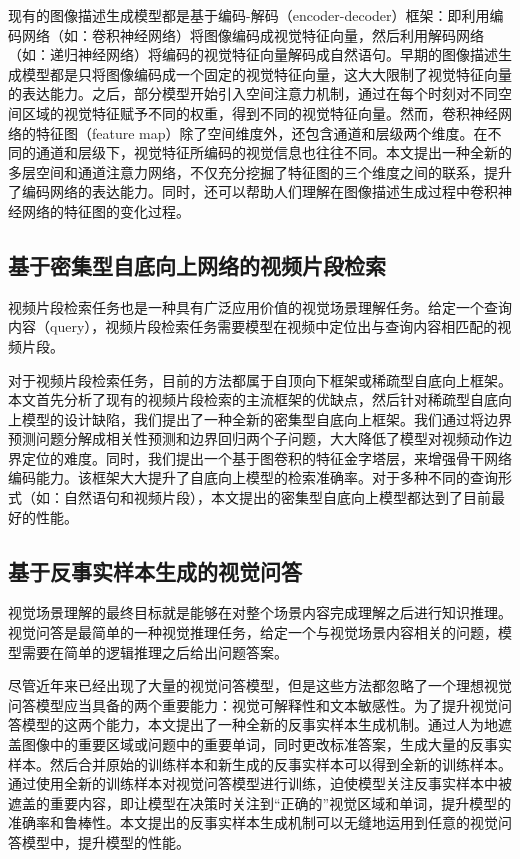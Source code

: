 现有的图像描述生成模型都是基于编码-解码（encoder-decoder）框架：即利用编码网络（如：卷积神经网络）将图像编码成视觉特征向量，然后利用解码网络（如：递归神经网络）将编码的视觉特征向量解码成自然语句。早期的图像描述生成模型都是只将图像编码成一个固定的视觉特征向量，这大大限制了视觉特征向量的表达能力。之后，部分模型开始引入空间注意力机制，通过在每个时刻对不同空间区域的视觉特征赋予不同的权重，得到不同的视觉特征向量。然而，卷积神经网络的特征图（feature map）除了空间维度外，还包含通道和层级两个维度。在不同的通道和层级下，视觉特征所编码的视觉信息也往往不同。本文提出一种全新的多层空间和通道注意力网络，不仅充分挖掘了特征图的三个维度之间的联系，提升了编码网络的表达能力。同时，还可以帮助人们理解在图像描述生成过程中卷积神经网络的特征图的变化过程。


\subsection{基于密集型自底向上网络的视频片段检索}

视频片段检索任务也是一种具有广泛应用价值的视觉场景理解任务。给定一个查询内容（query），视频片段检索任务需要模型在视频中定位出与查询内容相匹配的视频片段。

对于视频片段检索任务，目前的方法都属于自顶向下框架或稀疏型自底向上框架。本文首先分析了现有的视频片段检索的主流框架的优缺点，然后针对稀疏型自底向上模型的设计缺陷，我们提出了一种全新的密集型自底向上框架。我们通过将边界预测问题分解成相关性预测和边界回归两个子问题，大大降低了模型对视频动作边界定位的难度。同时，我们提出一个基于图卷积的特征金字塔层，来增强骨干网络编码能力。该框架大大提升了自底向上模型的检索准确率。对于多种不同的查询形式（如：自然语句和视频片段），本文提出的密集型自底向上模型都达到了目前最好的性能。


\subsection{基于反事实样本生成的视觉问答}

视觉场景理解的最终目标就是能够在对整个场景内容完成理解之后进行知识推理。视觉问答是最简单的一种视觉推理任务，给定一个与视觉场景内容相关的问题，模型需要在简单的逻辑推理之后给出问题答案。

尽管近年来已经出现了大量的视觉问答模型，但是这些方法都忽略了一个理想视觉问答模型应当具备的两个重要能力：视觉可解释性和文本敏感性。为了提升视觉问答模型的这两个能力，本文提出了一种全新的反事实样本生成机制。通过人为地遮盖图像中的重要区域或问题中的重要单词，同时更改标准答案，生成大量的反事实样本。然后合并原始的训练样本和新生成的反事实样本可以得到全新的训练样本。通过使用全新的训练样本对视觉问答模型进行训练，迫使模型关注反事实样本中被遮盖的重要内容，即让模型在决策时关注到“正确的”视觉区域和单词，提升模型的准确率和鲁棒性。本文提出的反事实样本生成机制可以无缝地运用到任意的视觉问答模型中，提升模型的性能。

